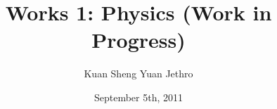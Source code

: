 

 
\setcounter{secnumdepth}{2}
\author{Kuan Sheng Yuan Jethro}
\date{September 5th, 2011}
\title{Works 1: Physics (Work in Progress)}
\maketitle

\setcounter{tocdepth}{2}
\tableofcontents
























